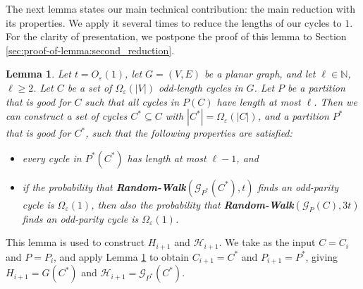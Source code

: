 \documentclass[11pt]{article}
\newtheorem{lemma}[theorem]{Lemma}
\newcommand{\COMMENTED}[1]{{}}
\newcommand{\junk}[1]{\COMMENTED{#1}}
\newcommand{\NAT}{\ensuremath{\mathbb{N}}}
\newcommand{\eps}{\ensuremath{\epsilon}}
\def\epsilon{\ensuremath{\varepsilon}}
\newcommand{\RW}{{\bf Random-Walk}}
\begin{document}
The next lemma states our main technical contribution: the main reduction with its properties. We apply it several times to reduce the lengths of our cycles to $1$. For the clarity of presentation, we postpone the proof of this lemma to Section \ref{sec:proof-of-lemma:second_reduction}.

\begin{lemma}
\label{lemma:second_reduction}
Let $t = O_{\eps}(1)$, let $G = (V,E)$ be a planar graph, and let $\ell \in \NAT$, $\ell \ge 2$. Let $C$ be a set of $\Omega_{\eps}(|V|)$ odd-length cycles in $G$. Let $P$ be a partition that is good for $C$ such that all cycles in $P(C)$ have length at most $\ell$. Then we can construct a set of cycles $C^* \subseteq C$ with $|C^*| = \Omega_{\eps}(|C|)$, and a partition $P^*$ that is good for $C^*$, such that the following properties are satisfied:
\begin{itemize}
\item every cycle in $P^*(C^*)$ has length at most $\ell-1$, and
\item if the probability that \RW$(\mathcal{G}_{P^*}(C^*),t)$ finds an odd-parity cycle is $\Omega_{\eps}(1)$, then also the probability that \RW$(\mathcal{G}_{P}(C),3t)$ finds an odd-parity cycle is $\Omega_{\eps}(1)$.
\end{itemize}
\end{lemma}

This lemma is used to construct $H_{i+1}$ and $\mathcal H_{i+1}$. We take as the input $C = C_i$ and $P = P_i$, and apply Lemma \ref{lemma:second_reduction} to obtain $C_{i+1} = C^*$ and $P_{i+1} = P^*$, giving $H_{i+1} = G(C^*)$ and $\mathcal{H}_{i+1} = \mathcal{G}_{P^*}(C^*)$.

\junk{
\begin{lemma}
Let $t=O_{\eps}(1)$. Let $G = (V,E)$ be a planar graph and let $\ell \in \NAT$, $\ell \ge 2$. Let $C_i$ be a set of $\Omega_{\eps}(|V|)$ edge disjoint odd-length cycles in $G$. Let $P_i$ be a partition that is good for $C_i$ such that all cycles in $P_i(C_i)$ have length at most $\ell$. Then we can construct a set of cycles $C_{i+1} \subseteq C_i$ with $|C_{i+1}| = \Omega_{\eps}(|C_i|)$, and a partition $P_{i+1}$ that is good for $C_{i+1}$, such that the following properties are satisfied:
\begin{itemize}
\item every cycle in $P_{i+1}(C_{i+1})$ has length at most $\ell-1$, and
\item if the probability that \RW$(\mathcal H_{i+1},t)$ finds an odd-parity cycle is $\Omega_{\eps}(1)$, then also the probability that \RW$(\mathcal H_i,2t)$ finds an odd-parity cycle is $\Omega_{\eps}(1)$.
\end{itemize}
\end{lemma}
}
\end{document}
